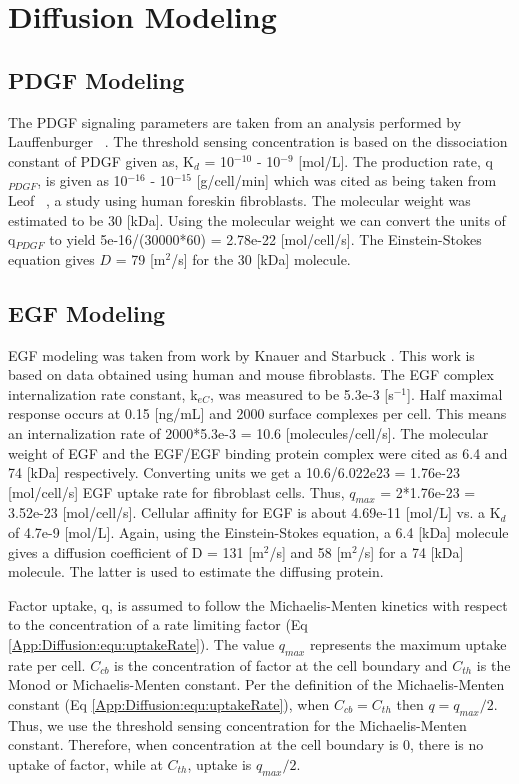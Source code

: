 \chapter{Diffusion Modeling}
\label{App:Diffusion}

\section{PDGF Modeling}
The PDGF signaling parameters are taken from an analysis performed by Lauffenburger \etal\ \cite{Lauffenburger:1989fy}. The threshold sensing concentration is based on the dissociation constant of PDGF given as, K$_{d}$ = 10$^{-10}$ - 10$^{-9}$ [mol/L]. The production rate, q$_{PDGF}$, is given as 10$^{-16}$ - 10$^{-15}$ [g/cell/min] which was cited as being taken from Leof \etal\ \cite{LEOF:1986uq}, a study using human foreskin fibroblasts. The molecular weight was estimated to be 30 [kDa]. Using the molecular weight we can convert the units of q$_{PDGF}$ to yield 5e-16/(30000*60) = 2.78e-22 [mol/cell/s]. The Einstein-Stokes equation gives $D$ = 79 [\textmu m$^{2}$/s] for the 30 [kDa] molecule.

\section{EGF Modeling}
EGF modeling was taken from work by Knauer \etal \cite{KNAUER:1984fj} and Starbuck \etal \cite{STARBUCK:1992kl}. This work is based on data obtained using human and mouse fibroblasts. The EGF complex internalization rate constant, k$_{eC}$, was measured to be  5.3e-3 [s$^{-1}$]. Half maximal response occurs at 0.15 [ng/mL] and 2000 surface complexes per cell. This means an internalization rate of 2000*5.3e-3 = 10.6 [molecules/cell/s]. The molecular weight of EGF and the EGF\slash EGF binding protein complex were cited as 6.4 and 74 [kDa] respectively. Converting units we get a 10.6/6.022e23 = 1.76e-23 [mol/cell/s] EGF uptake rate for fibroblast cells. Thus, $q_{max}$ = 2*1.76e-23 = 3.52e-23 [mol/cell/s]. Cellular affinity for EGF is about 4.69e-11 [mol/L] vs. a K$_{d}$ of 4.7e-9 [mol/L]. Again, using the Einstein-Stokes equation, a 6.4 [kDa] molecule gives a diffusion coefficient of D = 131 [\textmu m$^{2}$/s] and 58 [\textmu m$^{2}$/s] for a 74 [kDa] molecule. The latter is used to estimate the diffusing protein.

Factor uptake, q, is assumed to follow the Michaelis-Menten kinetics with respect to the concentration of a rate limiting factor (Eq \ref{App:Diffusion:equ:uptakeRate}). The value $q_{max}$ represents the maximum uptake rate per cell. $C_{cb}$ is the concentration of factor at the cell boundary and $C_{th}$ is the Monod or Michaelis-Menten constant. Per the definition of the Michaelis-Menten constant (Eq \ref{App:Diffusion:equ:uptakeRate}), when $C_{cb} = C_{th}$ then $q = q_{max}/2$. Thus, we use the threshold sensing concentration for the Michaelis-Menten constant. Therefore, when concentration at the cell boundary is 0, there is no uptake of factor, while at $C_{th}$, uptake is $q_{max}/2$.

